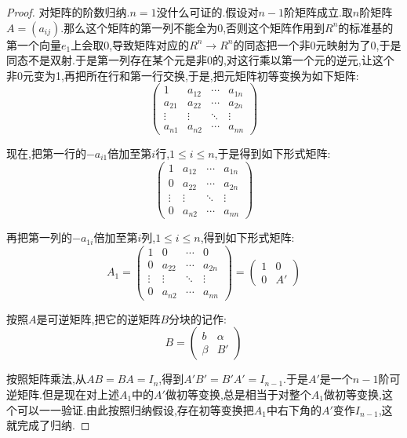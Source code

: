 \begin{proof}
	
	对矩阵的阶数归纳.$n=1$没什么可证的.假设对$n-1$阶矩阵成立.取$n$阶矩阵$A=(a_{ij})$.那么这个矩阵的第一列不能全为0,否则这个矩阵作用到$R^n$的标准基的第一个向量$e_1$上会取0,导致矩阵对应的$R^n\to R^n$的同态把一个非0元映射为了0,于是同态不是双射.于是第一列存在某个元是非0的,对这行乘以第一个元的逆元,让这个非0元变为1,再把所在行和第一行交换,于是,把元矩阵初等变换为如下矩阵:
	$$\left(\begin{array}{cccc}
	1&a_{12}&\cdots&a_{1n}\\
	a_{21}&a_{22}&\cdots&a_{2n}\\
	\vdots&\vdots&\ddots&\vdots\\
	a_{n1}&a_{n2}&\cdots&a_{nn}
	\end{array}\right)$$
	
	现在,把第一行的$-a_{i1}$倍加至第$i$行,$1\le i\le n$,于是得到如下形式矩阵:
	$$\left(\begin{array}{cccc}
	1&a_{12}&\cdots&a_{1n}\\
	0&a_{22}&\cdots&a_{2n}\\
	\vdots&\vdots&\ddots&\vdots\\
	0&a_{n2}&\cdots&a_{nn}
	\end{array}\right)$$
	
	再把第一列的$-a_{1i}$倍加至第$i$列,$1\le i\le n$,得到如下形式矩阵:
	$$A_1=\left(\begin{array}{cccc}
	1&0&\cdots&0\\
	0&a_{22}&\cdots&a_{2n}\\
	\vdots&\vdots&\ddots&\vdots\\
	0&a_{n2}&\cdots&a_{nn}
	\end{array}\right)=\left(\begin{array}{cc}
	1&0\\
	0&A'\end{array}\right)$$
	
	按照$A$是可逆矩阵,把它的逆矩阵$B$分块的记作:
	$$B=\left(\begin{array}{cc}
	b&\alpha\\
	\beta&B'\end{array}\right)$$
	
	按照矩阵乘法,从$AB=BA=I_n$,得到$A'B'=B'A'=I_{n-1}$.于是$A'$是一个$n-1$阶可逆矩阵.但是现在对上述$A_1$中的$A'$做初等变换,总是相当于对整个$A_1$做初等变换,这个可以一一验证.由此按照归纳假设,存在初等变换把$A_1$中右下角的$A'$变作$I_{n-1}$,这就完成了归纳.
\end{proof}

